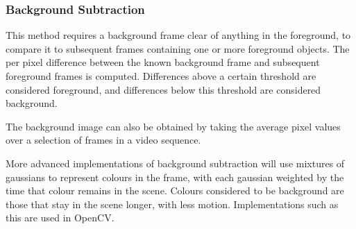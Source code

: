 \subsubsection{Background Subtraction}

This method requires a background frame clear of anything in the foreground, to compare it to subsequent frames containing one or more foreground objects. The per pixel difference between the known background frame and subsequent foreground frames is computed. Differences above a certain threshold are considered foreground, and differences below this threshold are considered background.

The background image can also be obtained by taking the average pixel values over a selection of frames in a video sequence.

More advanced implementations of background subtraction will use mixtures of gaussians to represent colours in the frame, with each gaussian weighted by the time that colour remains in the scene\cite{backgroundsubmog}. Colours considered to be background are those that stay in the scene longer, with less motion. Implementations such as this are used in OpenCV\cite{opencv}.